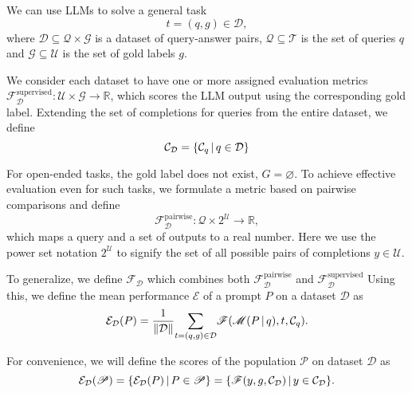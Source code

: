 We can use LLMs to solve a general task
\begin{equation}
    t = (q, g) \in \mathcal{D},
\end{equation}
where $\mathcal{D} \subseteq \mathcal{Q} \times \mathcal{G}$ is a dataset of query-answer pairs, $\mathcal{Q}\subseteq\mathcal{T}$ is the set of queries $q$
and $\mathcal{G}\subseteq\mathcal{U}$ is the set of gold labels $g$.

We consider each dataset to have one or more assigned evaluation metrics $\mathscr{F}_{\mathcal{D}}^{\text{supervised}}: \mathcal{U} \times \mathcal{G} \rightarrow \mathbb{R}$,
which scores the LLM output using the corresponding gold label. 
Extending the set of completions for queries from the entire dataset, we define
\begin{equation}
    \mathcal{C}_{\mathcal{D}} = \{\mathcal{C}_{q}\, \vert \, q \in \mathcal{D}\}
\end{equation}

For open-ended tasks, the gold label does not exist, $G = \varnothing$. To achieve effective evaluation even for such tasks, 
we formulate a metric based on pairwise comparisons and define
\begin{equation}
    \mathscr{F}_{\mathcal{D}}^{\text{pairwise}}: \mathcal{Q} \times 2^\mathcal{U} \rightarrow \mathbb{R},
\end{equation}
which maps a query and a set of outputs to a real number. Here we use the power set notation $2^\mathcal{U}$ to signify the set of all possible pairs of completions $y \in \mathcal{U}$.

To generalize, we define $\mathscr{F}_{\mathcal{D}}$ which combines both $\mathscr{F}_{\mathcal{D}}^{\text{pairwise}}$ and $\mathscr{F}_{\mathcal{D}}^{\text{supervised}}$
Using this, we define the mean performance $\mathcal{E}$ of a prompt $P$ on a dataset $\mathcal{D}$ as
\begin{equation}
    \mathcal{E}_{\mathcal{D}}(P) = \frac{1}{\Vert \mathcal{D} \Vert}\underset{t=(q,g)\in \mathcal{D}}{\sum}\mathscr{F}(\mathscr{M}(P\, \vert \, q), t, \mathcal{C}_{q}).
\end{equation}

For convenience, we will define the scores of the population $\mathscr{P}$ on dataset $\mathcal{D}$ as
\begin{equation}
    \mathcal{E}_{\mathcal{D}}(\mathscr{P}) = \{\mathcal{E}_{\mathcal{D}}(P)\, \vert \, P\in \mathscr{P}\} = \{\mathscr{F}(y, g, \mathcal{C}_{\mathcal{D}})\, \vert \, y \in \mathcal{C}_{\mathcal{D}}\}.
\end{equation}

